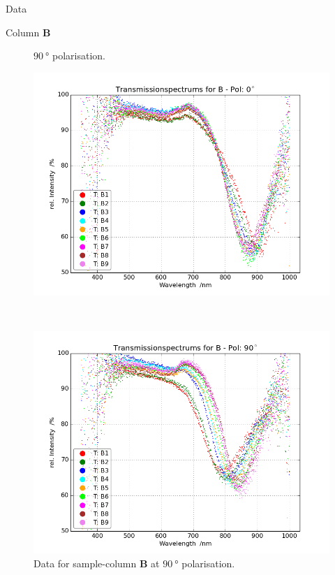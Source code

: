 \begin{appendix}
\begin{chapter}{Data}
\begin{section}{Column \textbf{B}}
\begin{figure}[ht!]
\begin{minipage}{.92\textwidth}
{              $\SI{90}{\degree}$ polarisation.}
          \label{fig:Refspec_BPol90}
        \end{minipage}
      \end{figure}
      \newpage
      \begin{figure}[ht!]
        \centering
        \begin{minipage}{.92\textwidth}
          \centering
          \includegraphics[width=\textwidth]{Figures/TransspecRAW_BPol0.png}
          \caption{Data for sample-column \textbf{B} at $\SI{0}{\degree}$
              polarisation.}
          \label{fig:TransspecRAW_BPol0}
        \end{minipage}\\
        \begin{minipage}{.92\textwidth}
          \centering
          \includegraphics[width=\textwidth]{Figures/TransspecRAW_BPol90.png}
          \caption{Data for sample-column \textbf{B} at $\SI{90}{\degree}$
              polarisation.}
          \label{fig:TransspecRAW_BPol90}
        \end{minipage}
      \end{figure}
      

\end{section}
\end{chapter}
\end{appendix}
